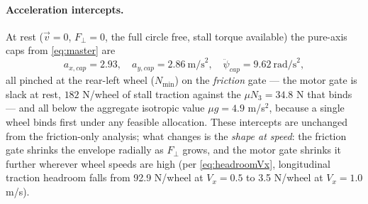 \documentclass[11pt]{article}
\begin{document}
\paragraph{Acceleration intercepts.} At rest ($\vec v=0$, $F_\perp=0$, the full circle free, stall
torque available) the pure-axis caps from \eqref{eq:master} are
\begin{equation}
a_{x,cap}=2.93,\quad a_{y,cap}=2.86\ \text{m/s}^2,\quad \ddot\psi_{cap}=9.62\ \text{rad/s}^2,
\end{equation}
all pinched at the rear-left wheel ($N_{\min}$) on the \emph{friction} gate --- the motor gate is
slack at rest, $182$ N/wheel of stall traction against the $\mu N_3=34.8$ N that binds --- and all
below the aggregate isotropic value $\mu g=4.9$ m/s$^2$, because a single wheel binds first under
any feasible allocation. These intercepts are unchanged from the friction-only analysis; what
changes is the \emph{shape at speed}: the friction gate shrinks the envelope radially as
$F_\perp$ grows, and the motor gate shrinks it further wherever wheel speeds are high (per
\eqref{eq:headroomVx}, longitudinal traction headroom falls from 92.9 N/wheel at $V_x=0.5$ to
3.5 N/wheel at $V_x=1.0$ m/s).
\end{document}
